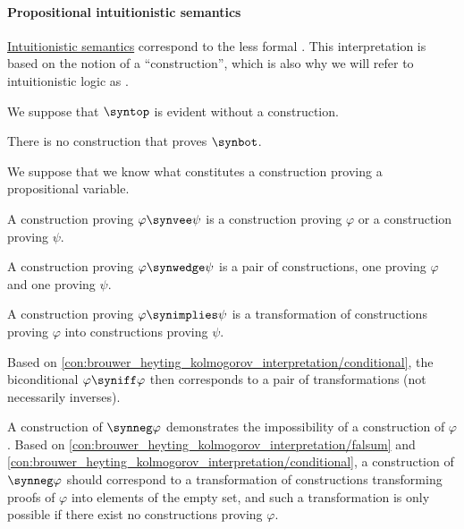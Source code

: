 \paragraph{Propositional intuitionistic semantics}

\begin{concept}\label{con:brouwer_heyting_kolmogorov_interpretation}
  \hyperref[def:propositional_semantics]{Intuitionistic semantics} correspond to the less formal . This interpretation is based on the notion of a \enquote{construction}, which is also why we will refer to intuitionistic logic as .

  \begin{thmenum}
     We suppose that \( \syntop \) is evident without a construction.

     There is no construction that proves \( \synbot \).

     We suppose that we know what constitutes a construction proving a propositional variable.

     A construction proving \( \varphi \synvee \psi \) is a construction proving \( \varphi \) or a construction proving \( \psi \).

     A construction proving \( \varphi \synwedge \psi \) is a pair of constructions, one proving \( \varphi \) and one proving \( \psi \).

     A construction proving \( \varphi \synimplies \psi \) is a transformation of constructions proving \( \varphi \) into constructions proving \( \psi \).

     Based on \cref{con:brouwer_heyting_kolmogorov_interpretation/conditional}, the biconditional \( \varphi \syniff \varphi \) then corresponds to a pair of transformations (not necessarily inverses).

     A construction of \( \synneg \varphi \) demonstrates the impossibility of a construction of \( \varphi \). Based on \cref{con:brouwer_heyting_kolmogorov_interpretation/falsum} and \cref{con:brouwer_heyting_kolmogorov_interpretation/conditional}, a construction of \( \synneg \varphi \) should correspond to a transformation of constructions transforming proofs of \( \varphi \) into elements of the empty set, and such a transformation is only possible if there exist no constructions proving \( \varphi \).
  \end{thmenum}
\end{concept}

